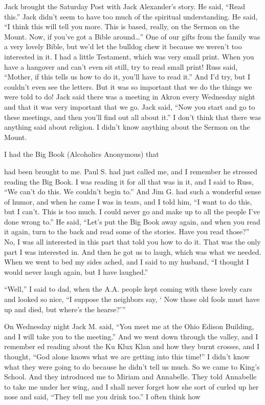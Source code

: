 Jack brought the Saturday Post with Jack Alexander’s story. He said, “Read this.” Jack didn’t seem to have too much of the spiritual understanding. He said, “I think this will tell you more. This is based, really, on the Sermon on the Mount. Now, if you’ve got a Bible around…” One of our gifts from the family was a very lovely Bible, but we’d let the bulldog chew it because we weren’t too interested in it. I had a little Testament, which was very small print. When you have a hangover and can’t even sit still, try to read small print! Russ said, “Mother, if this tells us how to do it, you’ll have to read it.” And I’d try, but I couldn’t even see the letters. But it was so important that we do the things we were told to do! Jack said there was a meeting in Akron every Wednesday night and that it was very important that we go. Jack said, “Now you start and go to these meetings, and then you’ll find out all about it.” I don’t think that there was anything said about religion. I didn’t know anything about the Sermon on the Mount.

I had the Big Book (Alcoholics Anonymous) that

had been brought to me. Paul S. had just called me, and I remember he stressed reading the Big Book. I was reading it for all that was in it, and I said to Russ, “We can’t do this. We couldn’t begin to.” And Jim G. had such a wonderful sense of humor, and when he came I was in tears, and I told him, “I want to do this, but I can’t. This is too much. I could never go and make up to all the people I’ve done wrong to.” He said, “Let’s put the Big Book away again, and when you read it again, turn to the back and read some of the stories. Have you read those?” No, I was all interested in this part that told you how to do it. That was the only part I was interested in. And then he got us to laugh, which was what we needed. When we went to bed my sides ached, and I said to my husband, “I thought I would never laugh again, but I have laughed.”

“Well,” I said to dad, when the A.A. people kept coming with these lovely cars and looked so nice, “I suppose the neighbors say, ‘ Now those old fools must have up and died, but where’s the hearse?'”

On Wednesday night Jack M. said, “You meet me at the Ohio Edison Building, and I will take you to the meeting.” And we went down through the valley, and I remember ed reading about the Ku Klux Klan and how they burnt crosses, and I thought, “God alone knows what we are getting into this time!” I didn’t know what they were going to do because he didn’t tell us much. So we came to King’s School. And they introduced me to Miriam and Annabelle. They told Annabelle to take me under her wing, and I shall never forget how she sort of curled up her nose and said, “They tell me you drink too.” I often think how

